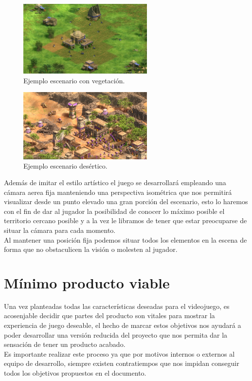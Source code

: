 \begin{figure}[ht]
\centering
\includegraphics[width=0.6\textwidth]{imagenes/gdd/mapa_aoe_1.jpg}
\caption{Ejemplo escenario con vegetación.}
\label{img:mapa_aoe1}
\end{figure}

\begin{figure}[ht]
\centering
\includegraphics[width=0.6\textwidth]{imagenes/gdd/mapa_aoe_2.jpg}
\caption{Ejemplo escenario desértico.}
\label{img:mapa_aoe2}
\end{figure}

Además de imitar el estilo artístico el juego se desarrollará empleando una cámara
aerea fija manteniendo una perspectiva isométrica que nos permitirá visualizar desde
un punto elevado una gran porción del escenario, esto lo haremos con el fin de dar al
jugador la posibilidad de conocer lo máximo posible el territorio cercano posible y a la
vez le libramos de tener que estar preocuparse de situar la cámara para cada momento. \\
Al mantener una posición fija podemos situar todos los elementos en la escena de forma
que no obstaculicen la visión o molesten al jugador.

\section{Mínimo producto viable}
Una vez planteadas todas las características deseadas para el videojuego, es acosenjable
decidir que partes del producto son vitales para mostrar la experiencia
de juego deseable, el hecho de marcar estos objetivos nos ayudará a poder desarrollar una
versión reducida del proyecto que nos permita dar la sensación de tener un producto acabado.\\
Es importante realizar este proceso ya que por motivos internos o externos al equipo de desarrollo,
siempre existen contratiempos que nos impidan conseguir todos los objetivos propuestos en el
documento.

